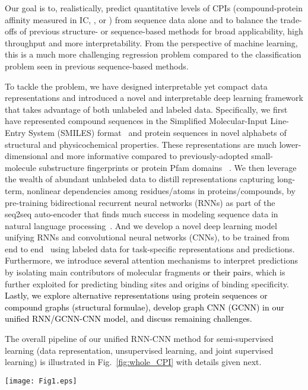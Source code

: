 \documentclass[nocrop]{bioinfo}
\newcommand{\red}[1]{\textcolor{black}{#1}}
\begin{document}
Our goal is to, realistically, predict quantitative levels of CPIs  (compound-protein affinity measured in IC, , or ) from sequence data alone and to balance the trade-offs of previous structure- or sequence-based methods for broad applicability, high throughput and more interpretability. From the perspective of machine learning, this is a much more challenging regression problem compared to the classification problem seen in previous sequence-based methods. 

To tackle the problem, we have designed interpretable yet compact data representations and introduced a novel and interpretable deep learning framework that takes advantage of both unlabeled and labeled data. 
Specifically, we first have represented compound sequences in the Simplified Molecular-Input Line-Entry System  (SMILES) format~\citep{weininger1988smiles} and protein sequences in novel alphabets of structural and physicochemical properties. These representations are much lower-dimensional and more informative compared to previously-adopted small-molecule substructure fingerprints or protein Pfam domains ~\citep{tian2016boosting}. We then leverage the wealth of abundant unlabeled data to distill representations capturing long-term, nonlinear dependencies among residues/atoms in proteins/compounds, by pre-training bidirectional recurrent neural networks  (RNNs) as part of the seq2seq auto-encoder that finds much success in modeling sequence data in natural language processing~\citep{kalchbrenner2013recurrent}. And we develop a novel deep learning model unifying RNNs and convolutional neural networks  (CNNs), to be trained from end to end~\citep{wang2016studying} using labeled data for task-specific representations and predictions. Furthermore, we introduce \red{several} attention mechanisms to interpret predictions by isolating main contributors of molecular fragments \red{or their pairs}, which is further exploited for predicting binding sites and origins of binding specificity.  \red{Lastly, we explore alternative representations using  protein sequences or compound graphs  (structural formulae), develop graph CNN (GCNN) in our unified RNN/GCNN-CNN model, and discuss remaining challenges.}

The overall pipeline of our unified RNN-CNN method for semi-supervised learning  (data representation, unsupervised learning, and joint supervised learning) is illustrated in Fig.~\ref{fig:whole_CPI} with details given next. 


\begin{figure*}[htb]
    \centering
     \vspace{-2em}
    \texttt{[image: Fig1.eps]}
        \vspace{-2em}
    \caption{The pipeline of our unified RNN-CNN method to predict \red{and interpret} compound-protein affinity.}
    \vspace{-1em}
    \label{fig:whole_CPI}
     \vspace{-1em}
\end{figure*}
\end{document}
